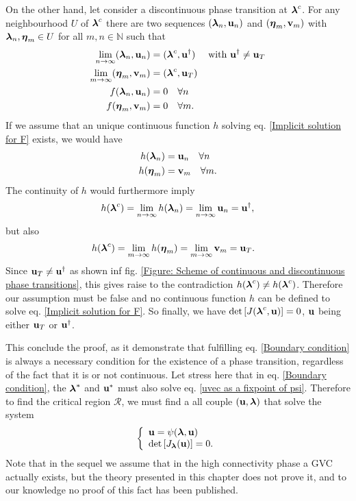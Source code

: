 \documentclass[
11pt, %
english, %
singlespacing, %
nolistspacing, %
liststotoc, %
headsepline, %
]{MastersDoctoralThesis} %
\begin{document}
On the other hand, let consider a discontinuous phase transition at $\boldsymbol{\mathrm{\lambda}}^c$. For any neighbourhood $U$ of $\boldsymbol{\mathrm{\lambda}}^c$ there are two sequences $(\boldsymbol{\mathrm{\lambda}}_n, \boldsymbol{\mathrm{u}}_n)$ and $(\boldsymbol{\mathrm{\eta}}_m, \boldsymbol{\mathrm{v}}_m)$ with $\boldsymbol{\mathrm{\lambda}}_n, \boldsymbol{\mathrm{\eta}}_m \in U$ for all $m, n \in \mathbb{N}$ such that
\begin{align}
	\lim_{n \rightarrow \infty} (\boldsymbol{\mathrm{\lambda}}_n, \boldsymbol{\mathrm{u}}_n) &= (\boldsymbol{\mathrm{\lambda}}^c, \boldsymbol{\mathrm{u}}^\dagger) \quad \text{ with } \boldsymbol{\mathrm{u}}^\dagger \neq \boldsymbol{\mathrm{u}}_T \\
	\lim_{m \rightarrow \infty} (\boldsymbol{\mathrm{\eta}}_m, \boldsymbol{\mathrm{v}}_m) &= (\boldsymbol{\mathrm{\lambda}}^c, \boldsymbol{\mathrm{u}}_T) \\
	f(\boldsymbol{\mathrm{\lambda}}_n, \boldsymbol{\mathrm{u}}_n) &= 0 \quad \forall n \\
	f(\boldsymbol{\mathrm{\eta}}_m, \boldsymbol{\mathrm{v}}_m) &= 0 \quad \forall m.
\end{align}
If we assume that an unique continuous function $h$ solving eq. \eqref{Implicit solution for F} exists, we would have
\begin{align}
	h(\boldsymbol{\mathrm{\lambda}}_n) &= \boldsymbol{\mathrm{u}}_n \quad \forall n \\
	h(\boldsymbol{\mathrm{\eta}}_m) &= \boldsymbol{\mathrm{v}}_m \quad \forall m.
\end{align}
The continuity of $h$ would furthermore imply
\begin{align}
	h(\boldsymbol{\mathrm{\lambda}}^c) = \lim_{n \rightarrow \infty} h(\boldsymbol{\mathrm{\lambda}}_n) = \lim_{n \rightarrow \infty} \boldsymbol{\mathrm{u}}_n = \boldsymbol{\mathrm{u}}^\dagger,
\end{align}
but also
\begin{align}
	h(\boldsymbol{\mathrm{\lambda}}^c) &= \lim_{m \rightarrow \infty} h(\boldsymbol{\mathrm{\eta}}_m) = \lim_{m \rightarrow \infty} \boldsymbol{\mathrm{v}}_m = \boldsymbol{\mathrm{u}}_T.
\end{align}
Since $\boldsymbol{\mathrm{u}}_T \neq \boldsymbol{\mathrm{u}}^\dagger$ as shown inf fig. \ref{Figure: Scheme of continuous and discontinuous phase transitions}, this gives raise to the contradiction $h(\boldsymbol{\mathrm{\lambda}}^c) \neq h(\boldsymbol{\mathrm{\lambda}}^c)$. Therefore our assumption must be false and no continuous function $h$ can be defined to solve eq. \eqref{Implicit solution for F}. So finally, we have $\det\left[ J(\boldsymbol{\mathrm{\lambda}}^c, \boldsymbol{\mathrm{u}}) \right] = 0$, $\boldsymbol{\mathrm{u}}$ being either $\boldsymbol{\mathrm{u}}_T$ or $\boldsymbol{\mathrm{u}}^\dagger$.

This conclude the proof, as it demonstrate that fulfilling eq. \eqref{Boundary condition} is always a necessary condition for the existence of a phase transition, regardless of the fact that it is or not continuous. Let stress here that in eq. \eqref{Boundary condition}, the $\boldsymbol{\mathrm{\lambda}}^*$ and $\boldsymbol{\mathrm{u}}^*$ must also solve eq. \eqref{uvec as a fixpoint of psi}. Therefore to find the critical region $\mathcal{R}$, we must find a all couple $(\boldsymbol{\mathrm{u}}, \boldsymbol{\mathrm{\lambda}})$ that solve the system
\begin{align}
	\left\{ \begin{array}{l} \boldsymbol{\mathrm{u}} = \psi(\boldsymbol{\mathrm{\lambda}}, \boldsymbol{\mathrm{u}}) \\ \det\left[ J_{\boldsymbol{\mathrm{\lambda}}}(\boldsymbol{\mathrm{u}}) \right] = 0. \end{array} \right. \label{Boundary condition full system}
\end{align}
Note that in the sequel we assume that in the high connectivity phase a GVC actually exists, but the theory presented in this chapter does not prove it, and to our knowledge no proof of this fact has been published.
\end{document}
